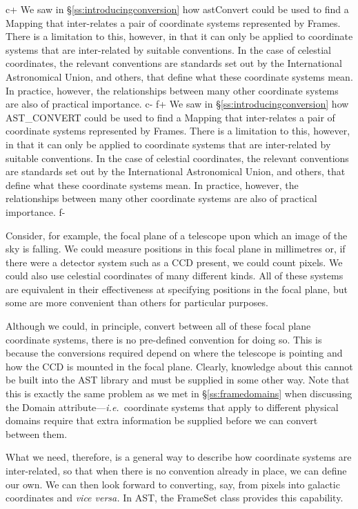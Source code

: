 \documentclass[twoside,11pt]{article}
\newcommand{\secref}[1]{\S\ref{#1}}
\newcommand{\secref}[1]{\ref{#1}}
\begin{document}
c+
We saw in \secref{ss:introducingconversion} how astConvert could be
used to find a Mapping that inter-relates a pair of coordinate systems
represented by Frames. There is a limitation to this, however, in that
it can only be applied to coordinate systems that are inter-related by
suitable conventions. In the case of celestial coordinates, the
relevant conventions are standards set out by the International
Astronomical Union, and others, that define what these coordinate
systems mean. In practice, however, the relationships between many
other coordinate systems are also of practical importance.
c-
f+
We saw in \secref{ss:introducingconversion} how AST\_CONVERT could be
used to find a Mapping that inter-relates a pair of coordinate systems
represented by Frames. There is a limitation to this, however, in that
it can only be applied to coordinate systems that are inter-related by
suitable conventions. In the case of celestial coordinates, the
relevant conventions are standards set out by the International
Astronomical Union, and others, that define what these coordinate
systems mean. In practice, however, the relationships between many
other coordinate systems are also of practical importance.
f-

Consider, for example, the focal plane of a telescope upon which an
image of the sky is falling. We could measure positions in this focal
plane in millimetres or, if there were a detector system such as a CCD
present, we could count pixels. We could also use celestial
coordinates of many different kinds. All of these systems are
equivalent in their effectiveness at specifying positions in the focal
plane, but some are more convenient than others for particular
purposes.

Although we could, in principle, convert between all of these focal
plane coordinate systems, there is no pre-defined convention for doing
so. This is because the conversions required depend on where the
telescope is pointing and how the CCD is mounted in the focal
plane. Clearly, knowledge about this cannot be built into the AST
library and must be supplied in some other way. Note that this is
exactly the same problem as we met in \secref{ss:framedomains} when
discussing the Domain attribute---{\em{i.e.}}\ coordinate systems that
apply to different physical domains require that extra information be
supplied before we can convert between them.

What we need, therefore, is a general way to describe how coordinate
systems are inter-related, so that when there is no convention already
in place, we can define our own. We can then look forward to
converting, say, from pixels into galactic coordinates and {\em{vice
versa.}}  In AST, the FrameSet class provides this capability.
\end{document}
